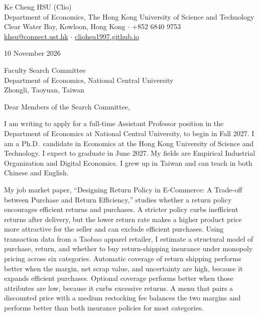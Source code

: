 \documentclass[11pt]{article}
\begin{document}
\begin{flushleft}
Ke Cheng HSU (Clio) \\
Department of Economics, The Hong Kong University of Science and Technology \\
Clear Water Bay, Kowloon, Hong Kong $\cdot$ +852 6840 9753 \\
\href{mailto:khsu@connect.ust.hk}{khsu@connect.ust.hk} $\cdot$ \href{https://cliohsu1997.github.io/}{cliohsu1997.github.io}
\end{flushleft}

10 November 2026

\vspace{0.12em}
Faculty Search Committee \\
Department of Economics, National Central University \\
Zhongli, Taoyuan, Taiwan

\vspace{0.12em}
Dear Members of the Search Committee,

I am writing to apply for a full-time Assistant Professor position in the Department of Economics at National Central University, to begin in Fall 2027. I am a Ph.D.\ candidate in Economics at the Hong Kong University of Science and Technology. I expect to graduate in June 2027. My fields are Empirical Industrial Organization and Digital Economics. I grew up in Taiwan and can teach in both Chinese and English.

My job market paper, ``Designing Return Policy in E-Commerce: A Trade-off between Purchase and Return Efficiency,'' studies whether a return policy encourages efficient returns and purchases. A stricter policy curbs inefficient returns after delivery, but the lower return rate makes a higher product price more attractive for the seller and can exclude efficient purchases. Using transaction data from a Taobao apparel retailer, I estimate a structural model of purchase, return, and whether to buy return-shipping insurance under monopoly pricing across six categories. Automatic coverage of return shipping performs better when the margin, net scrap value, and uncertainty are high, because it expands efficient purchases. Optional coverage performs better when those attributes are low, because it curbs excessive returns. A menu that pairs a discounted price with a medium restocking fee balances the two margins and performs better than both insurance policies for most categories.
\end{document}
